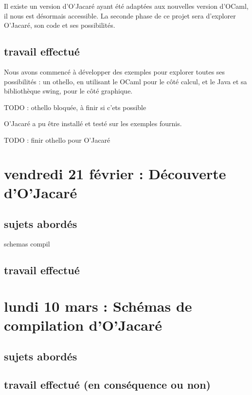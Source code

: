\documentclass[a4paper, 11pt]{report}
\begin{document}
Il existe un version d'O'Jacaré ayant été adaptées aux nouvelles
version d'OCaml, il nous est désormais accessible.
La seconde phase de ce projet sera d'explorer O'Jacaré, son code et
ses possibilités.
\subsection{travail effectué}
Nous avons commencé à développer des exemples pour explorer toutes ses
possibilités : un othello, en utilisant le OCaml pour le côté calcul,
et le Java et sa bibliothèque swing, pour le côté graphique. 

TODO : othello bloquée, à finir si c'ets possible

O'Jacaré a pu être installé et testé sur les exemples fournis.


TODO : finir othello pour O'Jacaré

\section{vendredi 21 février : Découverte d'O'Jacaré}
\subsection{sujets abordés}

schemas compil
\subsection{travail effectué}



\section{lundi 10 mars : Schémas de compilation d'O'Jacaré}
\subsection{sujets abordés}

\subsection{travail effectué (en conséquence ou non)}
\end{document}
